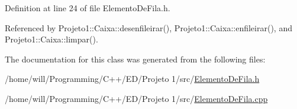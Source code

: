Definition at line 24 of file ElementoDeFila.h.



Referenced by Projeto1::Caixa::desenfileirar(), Projeto1::Caixa::enfileirar(), and Projeto1::Caixa::limpar().



The documentation for this class was generated from the following files:\begin{DoxyCompactItemize}
\item 
/home/will/Programming/C++/ED/Projeto 1/src/\hyperlink{ElementoDeFila_8h}{ElementoDeFila.h}\item 
/home/will/Programming/C++/ED/Projeto 1/src/\hyperlink{ElementoDeFila_8cpp}{ElementoDeFila.cpp}\end{DoxyCompactItemize}
